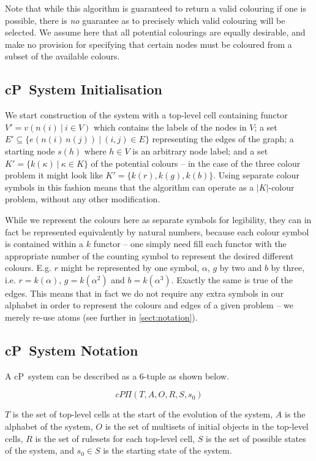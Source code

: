 Note that while this algorithm is guaranteed to return a valid colouring if one is possible, there is \emph{no} guarantee as to precisely which valid colouring will be selected.  We assume here that all potential colourings are equally desirable, and make no provision for specifying that certain nodes must be coloured from a subset of the available colours.

\subsection{\label{sect:sysinit}cP~System Initialisation}
We start construction of the system with a top-level cell containing functor \(V' = v(n(i)~|~i \in V)\) which contains the labels of the nodes in \(V\); a set \(E' \subseteq \{e(n(i)\,n(j))~|~(i,j) \in E\}\) representing the edges of the graph; a starting node \(s(h)\) where \(h \in V\) is an arbitrary node label; and a set \(K' = \{k(\kappa)~|~\kappa \in K\}\) of  the potential colours -- in the case of the three colour problem it might look like \(K' = \{k(r), k(g), k(b)\}\). Using separate colour symbols in this fashion means that the algorithm can operate as a \(|K|\)-colour problem, without any other modification.  %

While we represent the colours here as separate symbols for legibility, they can in fact be represented equivalently by natural numbers, because each colour symbol is contained within a \(k\) functor -- one simply need fill each functor with the appropriate number of the counting symbol to represent the desired different colours.  E.g. \(r\) might be represented by one symbol, \(\alpha\), \(g\) by two and \(b\) by three, i.e. \(r = k(\alpha)\), \(g = k(\alpha^2)\) and \(b = k(\alpha^3)\).  Exactly the same is true of the edges.  This means that in fact we do not require any extra symbols in our alphabet in order to represent the colours and edges of a given problem -- we merely re-use atoms (see further in \autoref{sect:notation}).

\subsection{\label{sect:notation}cP~System Notation}
A cP~system can be described as a 6-tuple as shown below.

\[
cP\Pi(T, A, O, R, S, s_0)
\]

\(T\) is the set of top-level cells at the start of the evolution of the system, \(A\) is the alphabet of the system, \(O\) is the set of multisets of initial objects in the top-level cells, \(R\) is the set of rulesets for each top-level cell, \(S\) is the set of possible states of the system, and \(s_0 \in S\) is the starting state of the system.

